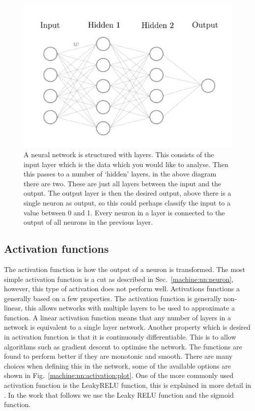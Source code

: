 \begin{figure}[h]
    \centering
    \includegraphics[width=\columnwidth]{C4_cnn/simple_network.pdf}
    \caption{A neural network is structured with layers. This consists of the input layer which is the data which you would like to analyse. Then this passes to a number of `hidden' layers, in the above diagram there are two. These are just all layers between the input and the output. The output layer is then the desired output, above there is a single neuron as output, so this could perhaps classify the input to a value between 0 and 1. Every neuron in a layer is connected to the output of all neurons in the previous layer.}
    \label{machine:nn:structure:plot}
\end{figure}


\subsection{\label{machine:nn:activation}Activation functions}

The activation function is how the output of a neuron is transformed. 
The most simple activation function is a cut as described in Sec.~\ref{machine:nn:neuron}, however, this type of activation does not perform well.
Activations functions a generally based on a few properties.
The activation function is generally non-linear, this allows networks with multiple layers to be used to approximate a function. A linear activation function means that any number of layers in a network is equivalent to a single layer network.
Another property which is desired in activation function is that it is continuously differentiable. This is to allow algorithms such as gradient descent to optimise the network. 
The functions are found to perform better if they are monotonic and smooth.
There are many choices when defining this in the network, some of the available options are shown in Fig.~\ref{machine:nn:activation:plot}.
One of the more commonly used activation function is the LeakyRELU function, this is explained in more detail in \citep{maas2013RectifierNonlinearities}.
In the work that follows we use the Leaky RELU function and the sigmoid function.


